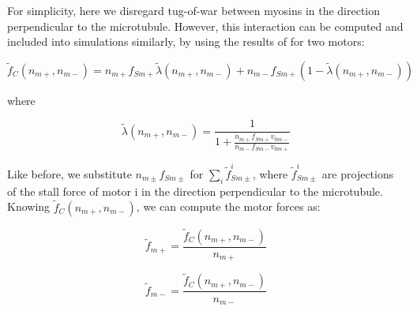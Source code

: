 For simplicity, here we disregard tug-of-war between myosins in the direction perpendicular to the microtubule. However, this interaction can be computed and included into simulations similarly, by using the results of \cite{gennerich2007force, muller2008tug, norstrom2010unconventional} for two motors:

\begin{equation}
\tilde{f}_C(n_{m+}, n_{m-}) = n_{m+}f_{Sm+}\tilde{\lambda}(n_{m+}, n_{m-}) + n_{m-}f_{Sm+}(1 - \tilde{\lambda}(n_{m+}, n_{m-}))
\end{equation}

where

\begin{equation}
\tilde{\lambda}(n_{m+}, n_{m-}) = \frac{1}{1+\frac{n_{m+}f_{Sm+}v_{0m-}}{n_{m-}f_{Sm-}v_{0m+}}}
\end{equation}
 
Like before, we substitute $n_{m\pm}f_{Sm\pm}$ for $\sum_{i}\tilde{f}^i_{Sm\pm}$, where $\tilde{f}^i_{Sm\pm}$ are projections of the stall force of motor i in the direction perpendicular to the microtubule. Knowing $\tilde{f}_C(n_{m+}, n_{m-})$, we can compute the motor forces as:

\begin{equation}
\tilde{f}_{m+} = \frac{\tilde{f}_C(n_{m+}, n_{m-})}{n_{m+}}
\end{equation}

\begin{equation}
\tilde{f}_{m-} = \frac{\tilde{f}_C(n_{m+}, n_{m-})}{n_{m-}}
\end{equation}